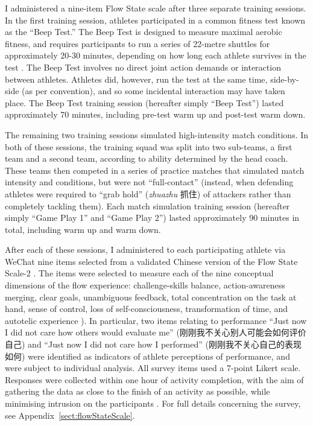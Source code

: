 \begin{CJK}{UTF8}{gbsn}
I administered a nine-item Flow State scale \citep{Jackson2002} after three separate training sessions.  In the first training session, athletes participated in a common fitness test known as the ``Beep Test.''  The Beep Test is designed to measure maximal aerobic fitness, and requires participants to run a series of 22-metre shuttles for approximately 20-30 minutes, depending on how long each athlete survives in the test \citep[see][]{Stickland2003}.  The Beep Test involves no direct joint action demands or interaction between athletes.  Athletes did, however, run the test at the same time, side-by-side (as per convention), and so some incidental interaction may have taken place.  The Beep Test training session (hereafter simply ``Beep Test'') lasted approximately 70 minutes, including pre-test warm up and post-test warm down.

The remaining two training sessions simulated high-intensity match conditions. In both of these sessions, the training squad was split into two sub-teams, a first team and a second team, according to ability determined by the head coach.  These teams then competed in a series of practice matches that simulated match intensity and conditions, but were not ``full-contact'' (instead, when defending athletes were required to ``grab hold'' (\textit{zhuazhu} 抓住) of attackers rather than completely tackling them).  Each match simulation training session (hereafter simply ``Game Play 1'' and ``Game Play 2'') lasted approximately 90 minutes in total, including warm up and warm down.

After each of these sessions, I administered to each participating athlete via WeChat nine items selected from a validated Chinese version \citep{Liu2012} of the Flow State Scale-2 \citep{Jackson2002}.  The items were selected to measure each of the nine conceptual dimensions of the flow experience: challenge-skills balance, action-awareness merging, clear goals, unambiguous feedback, total concentration on the task at hand, sense of control, loss of self-consciousness, transformation of time, and autotelic experience \citep{Csikszentmihalyi1990}).  In particular, two items relating to performance ``Just now I did not care how others would evaluate me'' (刚刚我不关心别人可能会如何评价自己) and ``Just now I did not care how I performed'' (刚刚我不关心自己的表现如何) were identified as indicators of athlete perceptions of performance, and were subject to individual analysis. All survey items used a 7-point Likert scale.  Responses were collected within one hour of activity completion, with the aim of gathering the data as close to the finish of an activity as possible, while minimising intrusion on the participants \citep{Jackson2004}. For full details concerning the survey, see Appendix~\ref{sect:flowStateScale}.


\end{CJK}
